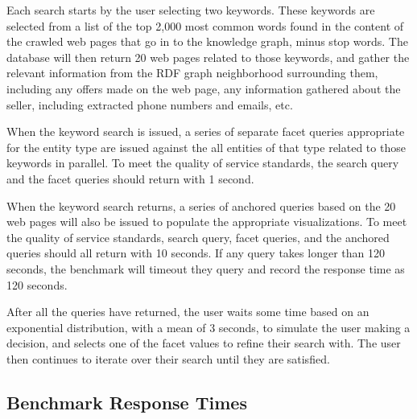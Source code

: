 Each search starts by the user selecting two keywords.  
These keywords are selected from a list of the top 2,000 most common words found in the content of the crawled web pages that go in to the knowledge graph, minus stop words. 
The database will then return 20 web pages related to those keywords, and gather the relevant information from the RDF graph neighborhood surrounding them, including any offers made on the web page, any information gathered about the seller, including extracted phone numbers and emails, etc.  

When the keyword search is issued, a series of separate facet queries appropriate for the entity type are issued against the all entities of that type related to those keywords in parallel.
To meet the quality of service standards, the search query and the facet queries should return with 1 second.

When the keyword search returns, a series of anchored queries based on the 20 web pages will also be issued to populate the appropriate visualizations. 
To meet the quality of service standards, search query, facet queries, and the anchored queries should all return with 10 seconds.  
If any query takes longer than 120 seconds, the benchmark will timeout they query and record the response time as 120 seconds.  

After all the queries have returned, the user waits some time based on an exponential distribution, with a mean of 3 seconds, to simulate the user making a decision, and selects one of the facet values to refine their search with.
The user then continues to iterate over their search until they are satisfied.  

\subsection{Benchmark Response Times}
